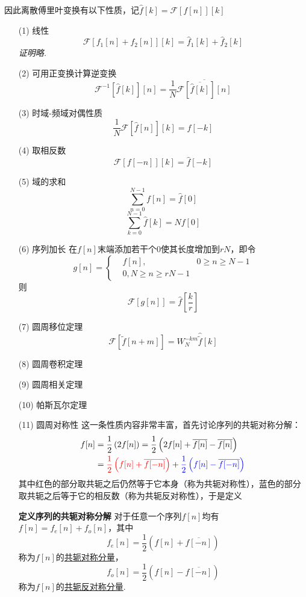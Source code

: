 \documentclass[UTF8]{ctexart}
\newenvironment{definition}[1]
    {\begin{tcolorbox}[enhanced, colback=LightYellow, breakable=false, frame hidden, borderline west={1.5mm}{-2mm}{DarkGreen}]
    {\bfseries {\color{DarkGreen} 定义}\quad #1} \newline}
    {\end{tcolorbox}}
\begin{document}
因此离散傅里叶变换有以下性质，记\(\hat{f}[k]=\mathcal{F}[f[n]][k]\)
\begin{itemize}
    \item [(1)] 线性
    \[\mathcal{F}[f_1[n]+f_2[n]][k]=\hat{f}_1[k]+\hat{f}_2[k]\]
    \textit{
        证明略.
    }
    \item [(2)] 可用正变换计算逆变换
    \[\mathcal{F}^{-1}\left[\hat{f}[k]\right][n] = \frac{1}{N}\overline{\mathcal{F}\left[\overline{\hat{f}[k]}\right][n]}\]
    \item [(3)] 时域-频域对偶性质
    \[\frac{1}{N}\mathcal{F}\left[\hat{f}[n]\right][k]=f[-k]\]
    \item [(4)] 取相反数
    \[\mathcal{F}[f[-n]][k]=\hat{f}[-k]\]
    \item [(5)] 域的求和
    \[\sum_{n=0}^{N-1}f[n]=\hat{f}[0]\]
    \[\sum_{k=0}^{N-1}\hat{f}[k]=Nf[0]\]
    \item [(6)] 序列加长
    在\(f[n]\)末端添加若干个\(0\)使其长度增加到\(rN\)，即令
    \[g[n]=\left\{\begin{aligned}& f[n], & 0 \geq n \geq N-1 \\ & 0, N \geq n \geq rN-1 \end{aligned}\right.\]
    则
    \[\mathcal{F}[g[n]]=\hat{f}\left[\frac{k}{r}\right]\]
    \item [(7)] 圆周移位定理
    \[\mathcal{F}\left[\tilde{f}[n+m]\right]=W_N^{-km}\hat{\tilde{f}}[k]\]
    \item [(8)] 圆周卷积定理
    \item [(9)] 圆周相关定理
    \item [(10)] 帕斯瓦尔定理
    \item [(11)] 圆周对称性
    \newline
    这一条性质内容非常丰富，首先讨论序列的共轭对称分解：
    \begin{align*}
        f[n] & =\frac{1}{2}\left(2f[n]\right)=\frac{1}{2}\left(2f[n]+\overline{f[n]}-\overline{f[n]}\right) \\
        &= {\color{red}\frac{1}{2}\left(f[n]+\overline{f[-n]}\right)}+{\color{blue}\frac{1}{2}\left(f[n]-\overline{f[-n]}\right)}
    \end{align*}
    其中红色的部分取共轭之后仍然等于它本身（称为共轭对称性），蓝色的部分取共轭之后等于它的相反数（称为共轭反对称性），于是定义
    \begin{definition}{序列的共轭对称分解}
        对于任意一个序列\(f[n]\)均有\(f[n]=f_e[n]+f_o[n]\)，其中
        \[f_e[n]=\frac{1}{2}\left(f[n]+\overline{f[-n]}\right)\]
        称为\(f[n]\)的\uline{共轭对称分量}，
        \[f_o[n]=\frac{1}{2}\left(f[n]-\overline{f[-n]}\right)\]
        称为\(f[n]\)的\uline{共轭反对称分量}.
    \end{definition}
\end{itemize}
\end{document}
